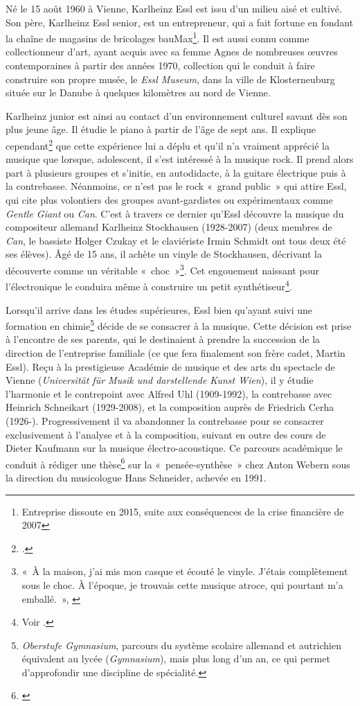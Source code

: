 \documentclass[a4paper,12pt]{article}
\newcommand{\guill}[1]{«~#1~»}
\begin{document}
Né le 15 août 1960 à Vienne, Karlheinz Essl est issu d'un milieu aisé et cultivé. Son père, Karlheinz Essl senior, est un entrepreneur, qui a fait fortune en fondant la chaîne de magasins de bricolages bauMax\footnote{Entreprise dissoute en 2015, suite aux conséquences de la crise financière de 2007}. Il est aussi connu comme collectionneur d'art, ayant acquis avec sa femme Agnes de nombreuses œuvres contemporaines à partir des années 1970, collection qui le conduit à faire construire son propre musée, le \emph{Essl Museum}, dans la ville de Klosterneuburg située sur le Danube à quelques kilomètres au nord de Vienne.

Karlheinz junior est ainsi au contact d'un environnement culturel savant dès son plus jeune âge. Il étudie le piano à partir de l'âge de sept ans. Il explique cependant\footnote{\cite{ehrler}.} que cette expérience lui a déplu et qu'il n'a vraiment apprécié la musique que lorsque, adolescent, il s'est intéressé à la musique rock. Il prend alors part à plusieurs groupes et s'initie, en autodidacte, à la guitare électrique puis à la contrebasse. Néanmoins, ce n'est pas le rock \guill{grand public} qui attire Essl, qui cite plus volontiers des groupes avant-gardistes ou expérimentaux comme \emph{Gentle Giant} ou \emph{Can}. C'est à travers ce dernier qu'Essl découvre la musique du compositeur allemand Karlheinz Stockhausen (1928-2007) (deux membres de \emph{Can}, le bassiste Holger Czukay et le claviériste Irmin Schmidt ont tous deux été ses élèves). Âgé de 15 ans, il achète un vinyle de Stockhausen, décrivant la découverte comme un véritable \guill{choc}\footnote{\guill{À la maison, j'ai mis mon casque et écouté le vinyle. J'étais complètement sous le choc. À l'époque, je trouvais cette musique atroce, qui pourtant m'a emballé.}, \cite{omniainomnibus}}. Cet engouement naissant pour l'électronique le conduira même à construire un petit synthétiseur\footnote{Voir \cite{ruckblickvorschau}.}.

Lorsqu'il arrive dans les études supérieures, Essl bien qu'ayant suivi une formation en chimie\footnote{\emph{Oberstufe Gymnasium}, parcours du système scolaire allemand et autrichien équivalent au lycée (\emph{Gymnasium}), mais plus long d'un an, ce qui permet d'approfondir une discipline de spécialité.} décide de se consacrer à la musique. Cette décision est prise à l'encontre de ses parents, qui le destinaient à prendre la succession de la direction de l'entreprise familiale (ce que fera finalement son frère cadet, Martin Essl). Reçu à la prestigieuse Académie de musique et des arts du spectacle de Vienne (\emph{Universität für Musik und darstellende Kunst Wien}), il y étudie l'harmonie et le contrepoint avec Alfred Uhl (1909-1992), la contrebasse avec Heinrich Schneikart (1929-2008), et la composition auprès de Friedrich Cerha (1926-). Progressivement il va abandonner la contrebasse pour se consacrer exclusivement à l'analyse et à la composition, suivant en outre des cours de Dieter Kaufmann sur la musique électro-acoustique. 	Ce parcours académique le conduit à rédiger une thèse\footnote{\cite{essl1991synthese}} sur la \guill{pensée-synthèse} chez Anton Webern sous la direction du musicologue Hans Schneider, achevée en 1991.
\end{document}
